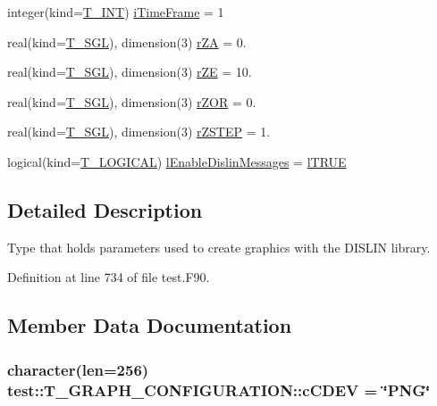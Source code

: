 \begin{DoxyCompactItemize}
\item 
integer(kind=\hyperlink{namespacetest_a6f91ebd89b58cfcc5da99faed9385c1e}{T\_\-INT}) \hyperlink{typetest_1_1_t___g_r_a_p_h___c_o_n_f_i_g_u_r_a_t_i_o_n_aca6e857b10a609b51a6519e5aac9e5e0}{iTimeFrame} = 1
\item 
real(kind=\hyperlink{namespacetest_a04d8b9090502de3a00046fe904bc3d99}{T\_\-SGL}), dimension(3) \hyperlink{typetest_1_1_t___g_r_a_p_h___c_o_n_f_i_g_u_r_a_t_i_o_n_a8ebfb43608409ca54b2cd6ca450403e1}{rZA} = 0.
\item 
real(kind=\hyperlink{namespacetest_a04d8b9090502de3a00046fe904bc3d99}{T\_\-SGL}), dimension(3) \hyperlink{typetest_1_1_t___g_r_a_p_h___c_o_n_f_i_g_u_r_a_t_i_o_n_a9f5a590f28b914ab67930cb496279ca5}{rZE} = 10.
\item 
real(kind=\hyperlink{namespacetest_a04d8b9090502de3a00046fe904bc3d99}{T\_\-SGL}), dimension(3) \hyperlink{typetest_1_1_t___g_r_a_p_h___c_o_n_f_i_g_u_r_a_t_i_o_n_a061f814d372b4d8df2a5079b38693f95}{rZOR} = 0.
\item 
real(kind=\hyperlink{namespacetest_a04d8b9090502de3a00046fe904bc3d99}{T\_\-SGL}), dimension(3) \hyperlink{typetest_1_1_t___g_r_a_p_h___c_o_n_f_i_g_u_r_a_t_i_o_n_af0b69b8e486897a38def90e2848c544f}{rZSTEP} = 1.
\item 
logical(kind=\hyperlink{namespacetest_acdeac586276a7d1d394fb5eddc77fc3d}{T\_\-LOGICAL}) \hyperlink{typetest_1_1_t___g_r_a_p_h___c_o_n_f_i_g_u_r_a_t_i_o_n_a92607d0a6e1ade6e279dfacd16d69b41}{lEnableDislinMessages} = \hyperlink{namespacetest_ab7046de13f01778d86667e4266521664}{lTRUE}
\end{DoxyCompactItemize}


\subsection{Detailed Description}
Type that holds parameters used to create graphics with the DISLIN library. 

Definition at line 734 of file test.F90.



\subsection{Member Data Documentation}
\hypertarget{typetest_1_1_t___g_r_a_p_h___c_o_n_f_i_g_u_r_a_t_i_o_n_adde2cf4c5be79e58cb1016aaaba25412}{
\subsubsection[{cCDEV}]{\setlength{\rightskip}{0pt plus 5cm}character(len=256) {\bf test::T\_\-GRAPH\_\-CONFIGURATION::cCDEV} = \char`\"{}PNG\char`\"{}}}
\label{typetest_1_1_t___g_r_a_p_h___c_o_n_f_i_g_u_r_a_t_i_o_n_adde2cf4c5be79e58cb1016aaaba25412}


